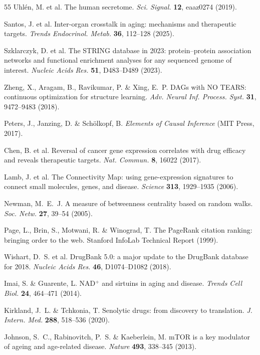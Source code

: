 \documentclass[11pt,a4paper]{article}
\begin{document}
\begin{thebibliography}{55}
Uhl\'{e}n, M. et al.
The human secretome.
\textit{Sci. Signal.} \textbf{12}, eaaz0274 (2019).

Santos, J. et al.
Inter-organ crosstalk in aging: mechanisms and therapeutic targets.
\textit{Trends Endocrinol. Metab.} \textbf{36}, 112--128 (2025).

Szklarczyk, D. et al.
The STRING database in 2023: protein--protein association networks and functional enrichment analyses for any sequenced genome of interest.
\textit{Nucleic Acids Res.} \textbf{51}, D483--D489 (2023).

Zheng, X., Aragam, B., Ravikumar, P. \& Xing, E.~P.
DAGs with NO TEARS: continuous optimization for structure learning.
\textit{Adv. Neural Inf. Process. Syst.} \textbf{31}, 9472--9483 (2018).

Peters, J., Janzing, D. \& Sch\"{o}lkopf, B.
\textit{Elements of Causal Inference} (MIT Press, 2017).

Chen, B. et al.
Reversal of cancer gene expression correlates with drug efficacy and reveals therapeutic targets.
\textit{Nat. Commun.} \textbf{8}, 16022 (2017).

Lamb, J. et al.
The Connectivity Map: using gene-expression signatures to connect small molecules, genes, and disease.
\textit{Science} \textbf{313}, 1929--1935 (2006).

Newman, M.~E.~J.
A measure of betweenness centrality based on random walks.
\textit{Soc. Netw.} \textbf{27}, 39--54 (2005).

Page, L., Brin, S., Motwani, R. \& Winograd, T.
The PageRank citation ranking: bringing order to the web.
Stanford InfoLab Technical Report (1999).

Wishart, D.~S. et al.
DrugBank 5.0: a major update to the DrugBank database for 2018.
\textit{Nucleic Acids Res.} \textbf{46}, D1074--D1082 (2018).

Imai, S. \& Guarente, L.
NAD$^+$ and sirtuins in aging and disease.
\textit{Trends Cell Biol.} \textbf{24}, 464--471 (2014).

Kirkland, J.~L. \& Tchkonia, T.
Senolytic drugs: from discovery to translation.
\textit{J. Intern. Med.} \textbf{288}, 518--536 (2020).

Johnson, S.~C., Rabinovitch, P.~S. \& Kaeberlein, M.
mTOR is a key modulator of ageing and age-related disease.
\textit{Nature} \textbf{493}, 338--345 (2013).


\end{thebibliography}
\end{document}
